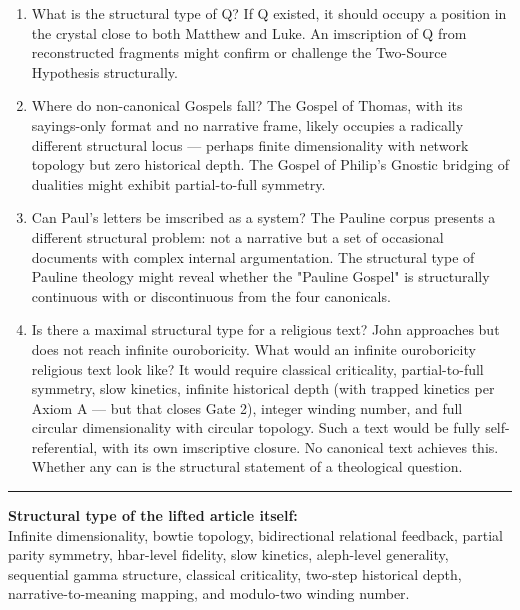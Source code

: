 \documentclass[12pt,a4paper]{article}
\begin{document}
\begin{enumerate}
    \item What is the structural type of Q? If Q existed, it should occupy a position in the crystal close to both Matthew and Luke. An imscription of Q from reconstructed fragments might confirm or challenge the Two-Source Hypothesis structurally.
    \item Where do non-canonical Gospels fall? The Gospel of Thomas, with its sayings-only format and no narrative frame, likely occupies a radically different structural locus --- perhaps finite dimensionality with network topology but zero historical depth. The Gospel of Philip's Gnostic bridging of dualities might exhibit partial-to-full symmetry.
    \item Can Paul's letters be imscribed as a system? The Pauline corpus presents a different structural problem: not a narrative but a set of occasional documents with complex internal argumentation. The structural type of Pauline theology might reveal whether the "Pauline Gospel" is structurally continuous with or discontinuous from the four canonicals.
    \item Is there a maximal structural type for a religious text? John approaches but does not reach infinite ouroboricity. What would an infinite ouroboricity religious text look like? It would require classical criticality, partial-to-full symmetry, slow kinetics, infinite historical depth (with trapped kinetics per Axiom A --- but that closes Gate 2), integer winding number, and full circular dimensionality with circular topology. Such a text would be fully self-referential, with its own imscriptive closure. No canonical text achieves this. Whether any can is the structural statement of a theological question.
\end{enumerate}

\begin{center}
\rule{0.5\textwidth}{0.4pt}
\end{center}

\textbf{Structural type of the lifted article itself:} \\
Infinite dimensionality, bowtie topology, bidirectional relational feedback, partial parity symmetry, hbar-level fidelity, slow kinetics, aleph-level generality, sequential gamma structure, classical criticality, two-step historical depth, narrative-to-meaning mapping, and modulo-two winding number.
\end{document}
